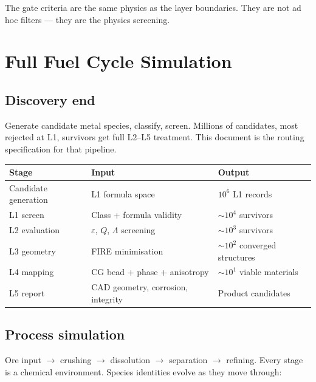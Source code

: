 \documentclass[11pt, a4paper, oneside]{article}
\theoremstyle{definition}
\begin{document}
The gate criteria are the same physics as the layer boundaries.
They are not ad hoc filters — they are the physics screening.

\section{Full Fuel Cycle Simulation}
\label{sec:fuel-cycle}

\subsection{Discovery end}

Generate candidate metal species, classify, screen.  Millions of
candidates, most rejected at L1, survivors get full L2–L5 treatment.
This document is the routing specification for that pipeline.

\begin{center}
\begin{tabular}{lll}
\toprule
Stage & Input & Output \\
\midrule
Candidate generation & L1 formula space & $10^6$ L1 records \\
L1 screen & Class + formula validity & $\sim 10^4$ survivors \\
L2 evaluation & $\varepsilon$, $Q$, $\Lambda$ screening & $\sim 10^3$ survivors \\
L3 geometry & FIRE minimisation & $\sim 10^2$ converged structures \\
L4 mapping & CG bead + phase + anisotropy & $\sim 10^1$ viable materials \\
L5 report & CAD geometry, corrosion, integrity & Product candidates \\
\bottomrule
\end{tabular}
\end{center}

\subsection{Process simulation}

Ore input $\to$ crushing $\to$ dissolution $\to$ separation $\to$
refining.  Every stage is a chemical environment.  Species identities
evolve as they move through:
\end{document}
